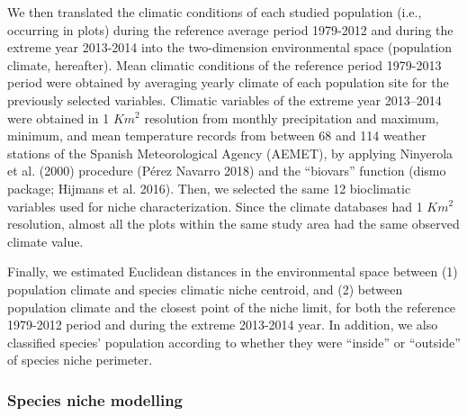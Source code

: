 \documentclass[11pt,twoside]{reedthesis}
\begin{document}
We then translated the climatic conditions of each studied population
(i.e., occurring in plots) during the reference average period 1979-2012
and during the extreme year 2013-2014 into the two-dimension
environmental space (population climate, hereafter). Mean climatic
conditions of the reference period 1979-2013 period were obtained by
averaging yearly climate of each population site for the previously
selected variables. Climatic variables of the extreme year 2013--2014
were obtained in 1 \(Km^2\) resolution from monthly precipitation and
maximum, minimum, and mean temperature records from between 68 and 114
weather stations of the Spanish Meteorological Agency (AEMET), by
applying Ninyerola et al. (2000) procedure (Pérez Navarro 2018) and the
``biovars'' function (dismo package; Hijmans et al. 2016). Then, we
selected the same 12 bioclimatic variables used for niche
characterization. Since the climate databases had 1 \(Km^2\) resolution,
almost all the plots within the same study area had the same observed
climate value.\par

Finally, we estimated Euclidean distances in the environmental space
between (1) population climate and species climatic niche centroid, and
(2) between population climate and the closest point of the niche limit,
for both the reference 1979-2012 period and during the extreme 2013-2014
year. In addition, we also classified species' population according to
whether they were ``inside'' or ``outside'' of species niche
perimeter.\par

\subsubsection{Species niche modelling}\label{species-niche-modelling}
\end{document}
